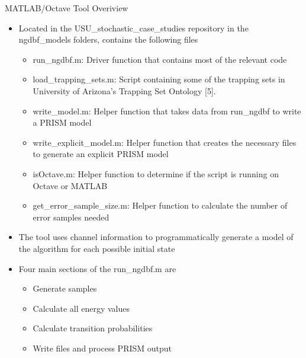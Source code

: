 \documentclass[10pt,ignorenonframetext,]{beamer}
\providecommand{\tightlist}{%
  \setlength{\itemsep}{0pt}\setlength{\parskip}{0pt}}
\begin{document}
\begin{frame}{MATLAB/Octave Tool Overiview}
\protect\hypertarget{matlaboctave-tool-overiview}{}
\begin{itemize}[<+->]
\tightlist
\item
  Located in the USU\_stochastic\_case\_studies repository in the
  ngdbf\_models folders, contains the following files

  \begin{itemize}[<+->]
  \tightlist
  \item
    run\_ngdbf.m: Driver function that contains most of the relevant
    code
  \item
    load\_trapping\_sets.m: Script containing some of the trapping sets
    in University of Arizona's Trapping Set Ontology {[}5{]}.
  \item
    write\_model.m: Helper function that takes data from run\_ngdbf to
    write a PRISM model
  \item
    write\_explicit\_model.m: Helper function that creates the necessary
    files to generate an explicit PRISM model
  \item
    isOctave.m: Helper function to determine if the script is running on
    Octave or MATLAB
  \item
    get\_error\_sample\_size.m: Helper function to calculate the number
    of error samples needed
  \end{itemize}
\item
  The tool uses channel information to programmatically generate a model
  of the algorithm for each possible initial state
\item
  Four main sections of the run\_ngdbf.m are

  \begin{itemize}[<+->]
  \tightlist
  \item
    Generate samples
  \item
    Calculate all energy values
  \item
    Calculate transition probabilities
  \item
    Write files and process PRISM output
  \end{itemize}
\end{itemize}
\end{frame}
\end{document}
